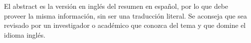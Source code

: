 
El abstract es la versión en inglés del resumen en español, por lo que debe proveer la misma información, sin ser una traducción literal. Se aconseja que sea revisado por un investigador o académico que conozca del tema y que domine el idioma inglés. 